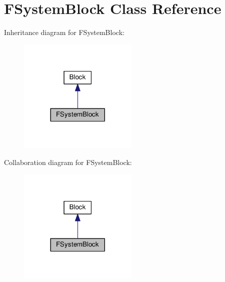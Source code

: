 \hypertarget{classFSystemBlock}{}\section{F\+System\+Block Class Reference}
\label{classFSystemBlock}


Inheritance diagram for F\+System\+Block\+:\nopagebreak
\begin{figure}[H]
\begin{center}
\leavevmode
\includegraphics[width=161pt]{classFSystemBlock__inherit__graph}
\end{center}
\end{figure}


Collaboration diagram for F\+System\+Block\+:\nopagebreak
\begin{figure}[H]
\begin{center}
\leavevmode
\includegraphics[width=161pt]{classFSystemBlock__coll__graph}
\end{center}
\end{figure}

